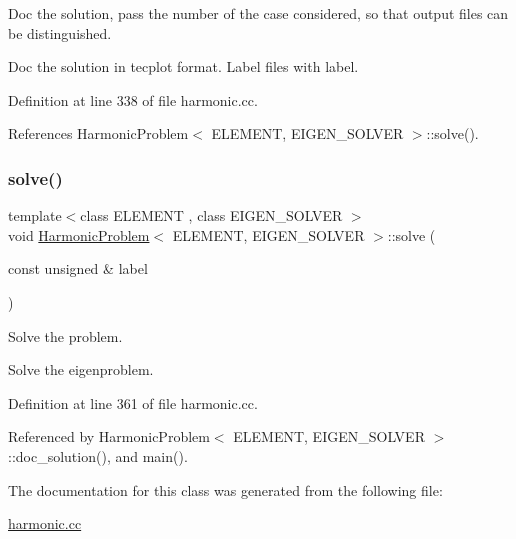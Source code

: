 Doc the solution, pass the number of the case considered, so that output files can be distinguished. 

Doc the solution in tecplot format. Label files with label. 

Definition at line 338 of file harmonic.\+cc.



References Harmonic\+Problem$<$ E\+L\+E\+M\+E\+N\+T, E\+I\+G\+E\+N\+\_\+\+S\+O\+L\+V\+E\+R $>$\+::solve().

\mbox{\label{classHarmonicProblem_aba2b3fd58a67f03ca0481e426d385c5d}} 
\subsubsection{\texorpdfstring{solve()}{solve()}}
{\footnotesize\ttfamily template$<$class E\+L\+E\+M\+E\+NT , class E\+I\+G\+E\+N\+\_\+\+S\+O\+L\+V\+ER $>$ \\
void \hyperlink{classHarmonicProblem}{Harmonic\+Problem}$<$ E\+L\+E\+M\+E\+NT, E\+I\+G\+E\+N\+\_\+\+S\+O\+L\+V\+ER $>$\+::solve (\begin{DoxyParamCaption}\item[{const unsigned \&}]{label }\end{DoxyParamCaption})}



Solve the problem. 

Solve the eigenproblem. 

Definition at line 361 of file harmonic.\+cc.



Referenced by Harmonic\+Problem$<$ E\+L\+E\+M\+E\+N\+T, E\+I\+G\+E\+N\+\_\+\+S\+O\+L\+V\+E\+R $>$\+::doc\+\_\+solution(), and main().



The documentation for this class was generated from the following file\+:\begin{DoxyCompactItemize}
\item 
\hyperlink{harmonic_8cc}{harmonic.\+cc}\end{DoxyCompactItemize}
